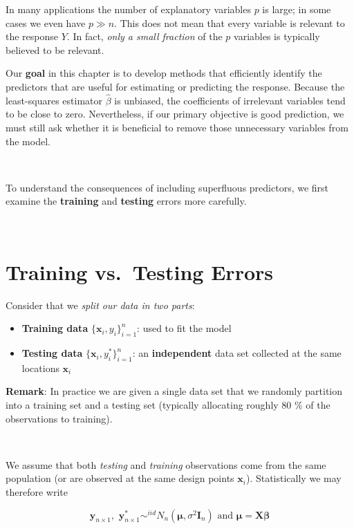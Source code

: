 \documentclass[
]{book}
\begin{document}
In many applications the number of explanatory variables \(p\) is large; in some cases we even have \(p \gg n\). This does not mean that every variable is relevant to the response \(Y\). In fact, \emph{only a small fraction} of the \(p\) variables is typically believed to be relevant.

Our \textbf{goal} in this chapter is to develop methods that efficiently identify the predictors that are useful for estimating or predicting the response. Because the least-squares estimator \(\hat{\beta}\) is unbiased, the coefficients of irrelevant variables tend to be close to zero. Nevertheless, if our primary objective is good prediction, we must still ask whether it is beneficial to remove those unnecessary variables from the model.

~

To understand the consequences of including superfluous predictors, we first examine the \textbf{training} and \textbf{testing} errors more carefully.

~

\section{Training vs.~Testing Errors}\label{training-vs.-testing-errors}

Consider that we \emph{split our data in two parts}:

\begin{itemize}
\item
  \textbf{Training data} \(\{\mathbf{x}_i, y_i \}_{i=1}^n\): used to fit the model
\item
  \textbf{Testing data} \(\{\mathbf{x}_i, y_i^* \}_{i=1}^n\): an \textbf{independent} data set collected at the same locations \(\mathbf{x}_i\)
\end{itemize}

\textbf{Remark}: In practice we are given a single data set that we randomly partition into a training set and a testing set (typically allocating roughly 80 \% of the observations to training).

~

We assume that both \emph{testing} and \emph{training} observations come from the same population (or are observed at the same design points \(\mathbf{x}_i\)). Statistically we may therefore write

\[\mathbf{y}_{n\times 1},\,\,  \mathbf{y}^*_{n\times 1}  \sim^{iid} N_n(\mathbf{\mu},\sigma^2 \mathbf{I}_n) \text{ and } \mathbf{\mu}=\mathbf{X}\mathbf{\beta}\]
\end{document}
